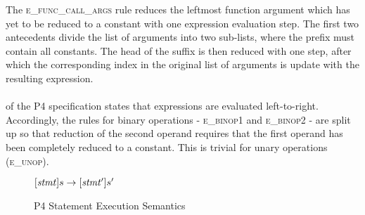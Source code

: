 \documentclass[UTF8]{article}
\begin{document}
The \textsc{e\_func\_call\_args} rule reduces the leftmost function argument which has yet to be reduced to a constant with one expression evaluation step. The first two antecedents divide the list of arguments into two sub-lists, where the prefix must contain all constants. The head of the suffix is then reduced with one step, after which the corresponding index in the original list of arguments is update with the resulting expression.
\\~\\
 of the P4 specification states that expressions are evaluated left-to-right. Accordingly, the rules for binary operations - \textsc{e\_binop1} and \textsc{e\_binop2} - are split up so that reduction of the second operand requires that the first operand has been completely reduced to a constant. This is trivial for unary operations (\textsc{e\_unop}).

\begin{figure}[ht!]
\begin{ottdefnblock}{$[  \mathit{stmt}  ]  s  \rightarrow  [  \mathit{stmt'}  ]  s'$}{}
\ottusedrule{\ottdrulestmtXXretXXe{}}
\ottusedrule{\ottdrulestmtXXassXXe{}}
\ottusedrule{\ottdrulestmtXXcondXXe{}}
\ottusedrule{\ottdrulestmtXXverifyXXeOne{}}
\ottusedrule{\ottdrulestmtXXverifyXXeTwo{}}
\end{ottdefnblock}
\caption{P4 Statement Execution Semantics}
\label{fig:semstmt2}
\end{figure}
\end{document}
